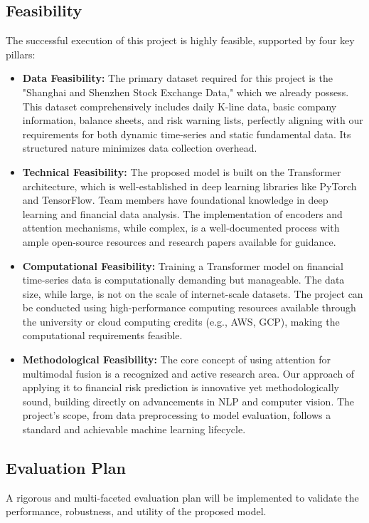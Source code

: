 \subsection{Feasibility}
The successful execution of this project is highly feasible, supported by four key pillars:
\begin{itemize}
    \item \textbf{Data Feasibility: } The primary dataset required for this project is the "Shanghai and Shenzhen Stock Exchange Data," which we already possess. This dataset comprehensively includes daily K-line data, basic company information, balance sheets, and risk warning lists, perfectly aligning with our requirements for both dynamic time-series and static fundamental data. Its structured nature minimizes data collection overhead.
    \item \textbf{Technical Feasibility: } The proposed model is built on the Transformer architecture, which is well-established in deep learning libraries like PyTorch and TensorFlow. Team members have foundational knowledge in deep learning and financial data analysis. The implementation of encoders and attention mechanisms, while complex, is a well-documented process with ample open-source resources and research papers available for guidance.
    \item \textbf{Computational Feasibility: } Training a Transformer model on financial time-series data is computationally demanding but manageable. The data size, while large, is not on the scale of internet-scale datasets. The project can be conducted using high-performance computing resources available through the university or cloud computing credits (e.g., AWS, GCP), making the computational requirements feasible.
    \item \textbf{Methodological Feasibility: } The core concept of using attention for multimodal fusion is a recognized and active research area. Our approach of applying it to financial risk prediction is innovative yet methodologically sound, building directly on advancements in NLP and computer vision. The project's scope, from data preprocessing to model evaluation, follows a standard and achievable machine learning lifecycle.
\end{itemize}


\subsection{Evaluation Plan}
A rigorous and multi-faceted evaluation plan will be implemented to validate the performance, robustness, and utility of the proposed model.

